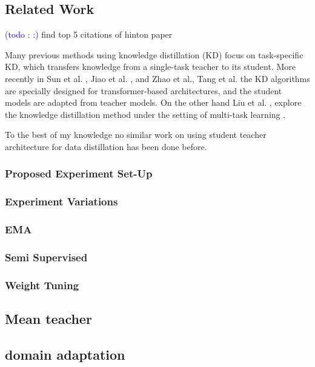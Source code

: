 \documentclass[compsoc,onecolumn]{IEEEtran}
\newcommand\todo[1]{\textcolor{blue}{(todo : #1)}}
\begin{document}
\subsection{Related Work}

\todo: find top 5 citations of hinton paper

Many previous methods using knowledge distillation (KD) focus on task-specific KD, which transfers knowledge from a single-task teacher to its student. More recently in Sun et al. \citep*{seo2016bidirectional} , Jiao et al. \citep*{jiao2019tinybert}, and Zhao et al.\citep*{zhao2019extreme}, Tang et al. \citep*{tang2019distilling} the KD algorithms are specially designed
for transformer-based architectures, and the student models are adapted from teacher models. On the other hand Liu et al. \citep*{liu2019attentive}, explore the knowledge distillation method under the setting of multi-task learning \citep*{caruana1997multitask} \citep*{baxter2000model}.

To the best of my knowledge no similar work on using student teacher architecture for data distillation has been done before.
\subsubsection{Proposed Experiment Set-Up}

\subsubsection{Experiment Variations}

\subsubsection{EMA}
\subsubsection{Semi Supervised}
\subsubsection{Weight Tuning}





\subsection{Mean teacher}

\subsection{domain adaptation }
\end{document}
